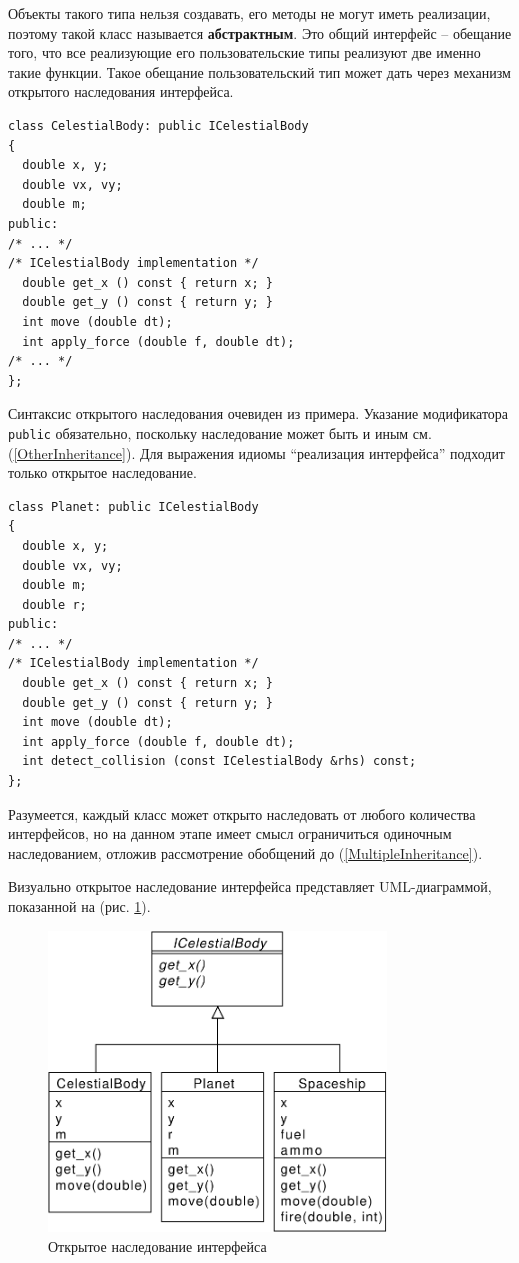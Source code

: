 \documentclass[a4paper,12pt,oneside]{article}
\begin{document}
Объекты такого типа нельзя создавать, его методы не могут иметь реализации, поэтому такой класс называется \textbf{абстрактным}. Это общий интерфейс -- обещание того, что все реализующие его пользовательские типы реализуют две именно такие функции. Такое обещание пользовательский тип может дать через механизм открытого наследования интерфейса.

\begin{lstlisting}
class CelestialBody: public ICelestialBody
{
  double x, y;
  double vx, vy;
  double m;
public:
/* ... */
/* ICelestialBody implementation */
  double get_x () const { return x; }
  double get_y () const { return y; }
  int move (double dt); 
  int apply_force (double f, double dt);
/* ... */
};
\end{lstlisting}

Синтаксис открытого наследования очевиден из примера. Указание модификатора \lstinline!public! обязательно, поскольку наследование может быть и иным см. (\ref{OtherInheritance}). Для выражения идиомы ``реализация интерфейса'' подходит только открытое наследование. 

\begin{lstlisting}
class Planet: public ICelestialBody
{
  double x, y;
  double vx, vy;
  double m;
  double r;
public:
/* ... */
/* ICelestialBody implementation */
  double get_x () const { return x; }
  double get_y () const { return y; }
  int move (double dt);
  int apply_force (double f, double dt);
  int detect_collision (const ICelestialBody &rhs) const;
};
\end{lstlisting}

Разумеется, каждый класс может открыто наследовать от любого количества интерфейсов, но на данном этапе имеет смысл ограничиться одиночным наследованием, отложив рассмотрение обобщений до (\ref{MultipleInheritance}).

Визуально открытое наследование интерфейса представляет UML-диаграммой, показанной на (рис. \ref{fig:inheritance-interface}).

\begin{figure}[ht]
\centering
\includegraphics[width=0.8\textwidth]{illustrations/intf-inheritance-crop.pdf}
\caption{Открытое наследование интерфейса}
\label{fig:inheritance-interface}
\end{figure}
\end{document}
